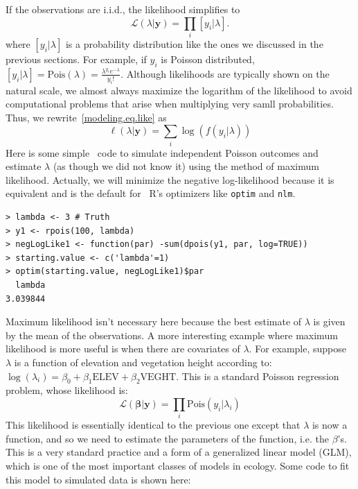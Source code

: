 If the observations are i.i.d., the likelihood simplifies to
\begin{equation}
  \mathcal{L}(\lambda | \mathbf{y}) = \prod_i [y_i | \lambda].
  \label{modeling.eq.like}
\end{equation}
where $[y_i | \lambda]$ is a probability distribution like the ones
we discussed in the previous sections. For example, if $y_i$ is
Poisson distributed, $[y_i | \lambda] = \text{Pois}(\lambda) =
\frac{\lambda^{y_i}e^{-\lambda}}{y_i!}$.
Although likelihoods are typically shown on the natural scale, we
almost always maximize the logarithm of the likelihood to
avoid computational problems that arise when multiplying very samll
probabilities. Thus, we rewrite~\ref{modeling.eq.like} as
\begin{equation}
  \ell(\lambda | \mathbf{y}) = \sum_i \log(f(y_i | \lambda))
  \label{modeling.eq.like}
\end{equation}
Here is some simple \R~code to simulate independent Poisson outcomes
and estimate $\lambda$ (as though we did not know it) using the
method of maximum likelihood. Actually, we will minimize the negative
log-likelihood because it is equivalent and is the default for ~R's
optimizers like \verb+optim+ and \verb+nlm+.
\begin{verbatim}
> lambda <- 3 # Truth
> y1 <- rpois(100, lambda)
> negLogLike1 <- function(par) -sum(dpois(y1, par, log=TRUE))
> starting.value <- c('lambda'=1)
> optim(starting.value, negLogLike1)$par
  lambda
3.039844
\end{verbatim}
Maximum likelihood isn't necessary here because the best estimate of
$\lambda$ is given by the mean of the observations. A more interesting
example where maximum likelihood is more useful is when there are
covariates of $\lambda$. For example, suppose $\lambda$ is a function
of elevation and vegetation height according to: $\log(\lambda_i) =
\beta_0 + \beta_1\text{ELEV} + \beta_2\text{VEGHT}$. This is a
standard Poisson regression problem, whose likelihood is:
\begin{equation}
  \mathcal{L}(\bm{\beta} | \mathbf{y}) = \prod_i \text{Pois}(y_i | \lambda_i)
  \label{modeling.eq.like}
\end{equation}
This likelihood is essentially identical to the previous one except
that $\lambda$ is now a function, and so we need to estimate the
parameters of the function, i.e. the $\beta$'s. This is a very
standard practice and a form of a generalized linear model (GLM),
which is one of the most important classes of models in ecology. Some
code to fit this model to simulated data is shown here:
